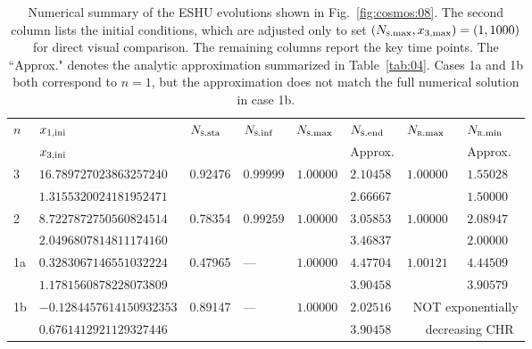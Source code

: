 \documentclass[aps,prd,twocolumn]{revtex4-2}
\newcommand\subini{{\rm ini}}
\newcommand\subRmax{{\rm \textsc{r}.max}}
\newcommand\subRmin{{\rm \textsc{r}.min}}
\newcommand\subSsta{{\rm \textsc{s}.sta}}
\newcommand\subSmax{{\rm \textsc{s}.max}}
\newcommand\subSend{{\rm \textsc{s}.end}}
\newcommand\subSinf{{\rm \textsc{s}.inf}}
\newcommand\submax{{\rm max}}
\begin{document}
\begin{table}[!t]
  \caption{Numerical summary of the ESHU evolutions shown in Fig.~\ref{fig:cosmos:08}. The second column lists the initial conditions, which are adjusted only to set $(N_\subSmax,x_{3,\submax})=(1,1000)$ for direct visual comparison. The remaining columns report the key time points. The ``Approx." denotes the analytic approximation summarized in Table~\ref{tab:04}. Cases 1a and 1b both correspond to $n=1$, but the approximation does not match the full numerical solution in case 1b.}
  \label{tab:05}
  \begin{tabular*}{\hsize}{@{\ \ }@{\extracolsep{\fill}}llllllll@{}}
    \hline\hline
    \multirow{2}{*}{$n$}  &  $x_{1,\subini}$  &  \multirow{2}{*}{$N_\subSsta$}  &  \multirow{2}{*}{$N_\subSinf$}  &  \multirow{2}{*}{$N_\subSmax$}  &  $N_\subSend$  &      \multirow{2}{*}{$N_\subRmax$}  &  $N_\subRmin$  \\[-1mm]
      &  $x_{3,\subini}$  &  &  &  &  Approx.  &  &  Approx.  \\
    \hline
    \multirow{2}{*}{3}   &  $16.789727023863257240$  &  \multirow{2}{*}{0.92476}  &  \multirow{2}{*}{$0.99999$}  &  \multirow{2}{*}{$1.00000$}  &  $2.10458$  &  \multirow{2}{*}{$1.00000$}  &  $1.55028$  \\
                         &  $1.3155320024181952471$  &  &                               &                              &  $2.66667$  &                              &  $1.50000$  \\
    \hline
    \multirow{2}{*}{2}   &  $8.7227872750560824514$  &  \multirow{2}{*}{0.78354}  &  \multirow{2}{*}{$0.99259$}  &  \multirow{2}{*}{$1.00000$}  &  $3.05853$  &  \multirow{2}{*}{$1.00000$}  &  $2.08947$  \\
                         &  $2.0496807814811174160$  &  &                               &                              &  $3.46837$  &                              &  $2.00000$  \\
    \hline
    \multirow{2}{*}{1a}  &  $0.3283067146551032224$  &  \multirow{2}{*}{0.47965}  &  \multirow{2}{*}{---}         &  \multirow{2}{*}{$1.00000$}  &  $4.47704$  &  \multirow{2}{*}{$1.00121$}  &  $4.44509$  \\
                         &  $1.1781560878228073809$  &  &                               &                              &  $3.90458$  &                              &  $3.90579$  \\
    \hline
    \multirow{2}{*}{1b}  &  \hspace{-0.78em}$-0.1284457614150932353$  &  \multirow{2}{*}{0.89147}  &  \multirow{2}{*}{---}  &  \multirow{2}{*}{$1.00000$}  &  $2.02516$  &  \multicolumn{2}{l}{\ NOT exponentially}  \\
                         &  $0.6761412921129327446$                   &  &                        &                              &  $3.90458$  &  \multicolumn{2}{l}{\ \ \ decreasing CHR}  \\
    \hline\hline
  \end{tabular*}
\end{table}
 
\end{document}
